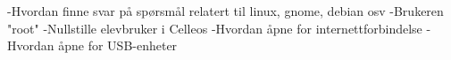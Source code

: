 



-Hvordan finne svar p\aa{} sp\o rsm\aa l relatert til linux, gnome, debian osv
-Brukeren "root"
-Nullstille elevbruker i Celleos
-Hvordan \aa pne for internettforbindelse
-Hvordan \aa pne for USB-enheter

\vfill\eject\bye
